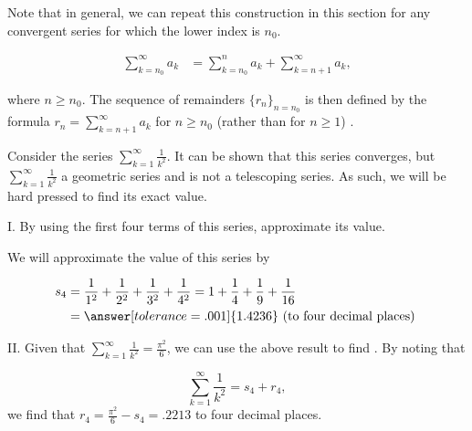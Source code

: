 \documentclass{ximera}
\begin{document}
\begin{image}
  \end{image}



\begin{remark}
Note that in general, we can repeat this construction in this section for any convergent series for which the lower index is $n_0$.

\begin{align*}
\sum_{k=n_0}^\infty a_k &= \sum_{k=n_0}^n a_k+\sum_{k=n+1}^\infty a_k,
\end{align*}

where $n \geq n_0$.  The sequence of remainders $\{r_n\}_{n=n_0}$ is then defined by the formula $r_n = \sum_{k=n+1}^{\infty} a_k$ for $n \geq n_0$ (rather than for $n \geq 1$) . 
\end{remark}

\begin{example}
Consider the series $\sum_{k=1}^{\infty} \frac{1}{k^2}$.  It can be shown that this series converges, but $\sum_{k=1}^{\infty} \frac{1}{k^2}$  a geometric series and is not a telescoping series.  As such, we will be hard pressed to find its exact value.

I. By using the first four terms of this series, approximate its value.

\begin{explanation}
We will approximate the value of this series by 

\begin{align*}
s_4 &= \frac{1}{1^2}+\frac{1}{2^2}+\frac{1}{3^2}+\frac{1}{4^2} =1+\frac{1}{4}+\frac{1}{9}+\frac{1}{16} \\
&  = \answer[tolerance=.001]{1.4236} \textrm{ (to four decimal places) }
\end{align*}


II. Given that $\sum_{k=1}^{\infty} \frac{1}{k^2} = \frac{\pi^2}{6}$, we can use the above result to find .  By noting that 

\[
\sum_{k=1}^{\infty} \frac{1}{k^2} = s_4+r_4,
\]
we find that $r_4 = \frac{\pi^2}{6} - s_4 = .2213$ to four decimal places.
\end{explanation}

\end{example}
\end{document}
